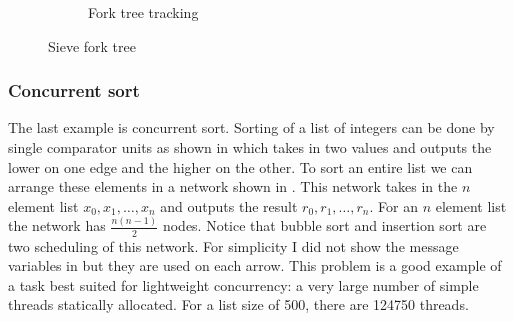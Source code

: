 \documentclass[12pt,twoside,notitlepage]{report}
\begin{document}
\begin{figure}
\begin{subfigure}[b]{0.45\linewidth}
\caption{Fork tree tracking}
\label{fig:sieve_ftt}
\end{subfigure}
%

%
%

%
\caption{Sieve fork tree}
\label{fig:sieve_fork_tree}
\end{figure}








\subsubsection{Concurrent sort}
The last example is concurrent sort. Sorting of a list of integers can be done by single comparator units as shown in  which takes in two values and outputs the lower on one edge and the higher on the other. To sort an entire list we can arrange these elements in a network shown in . This network takes in the $ n $ element list $ x_0, x_1, \dots, x_n $ and outputs the result $ r_0, r_1, \dots, r_n $. For an $ n $ element list the network has $ \frac{n(n-1)}{2} $ nodes. Notice that bubble sort and insertion sort are two scheduling of this network. For simplicity I did not show the message variables in  but they are used on each arrow. This problem is a good example of a task best suited for lightweight concurrency: a very large number of simple threads statically allocated. For a list size of 500, there are 124750 threads. 
\end{document}
